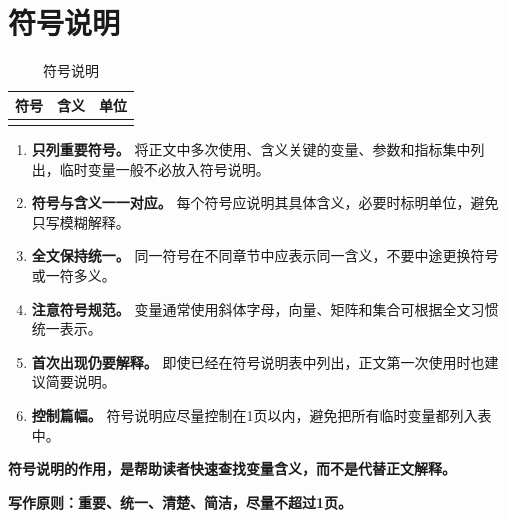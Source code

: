 \section{符号说明}
\begin{table}[!htbp]%
    \caption{符号说明}\label{tab:demo} \centering %
    \renewcommand{\arraystretch}{1.0}%
    \begin{tabularx}{0.7\textwidth}{%
        >{\centering\arraybackslash}X %
        >{\centering\arraybackslash}X
        >{\centering\arraybackslash}X
    }
        \toprule[1.5pt]%
        符号 & 含义 & 单位 \\%
        \midrule[1pt]
        \addlinespace %
        \addlinespace
        \addlinespace
        \addlinespace
        \bottomrule[1.5pt]
    \end{tabularx}
\end{table}
\begin{enumerate}[label=(\arabic*), leftmargin=2.5em, itemsep=0.3em]
\item \textbf{只列重要符号。} 将正文中多次使用、含义关键的变量、参数和指标集中列出，临时变量一般不必放入符号说明。

\item \textbf{符号与含义一一对应。} 每个符号应说明其具体含义，必要时标明单位，避免只写模糊解释。

\item \textbf{全文保持统一。} 同一符号在不同章节中应表示同一含义，不要中途更换符号或一符多义。

\item \textbf{注意符号规范。} 变量通常使用斜体字母，向量、矩阵和集合可根据全文习惯统一表示。

\item \textbf{首次出现仍要解释。} 即使已经在符号说明表中列出，正文第一次使用时也建议简要说明。

\item \textbf{控制篇幅。} 符号说明应尽量控制在1页以内，避免把所有临时变量都列入表中。
\end{enumerate}
\textbf{符号说明的作用，是帮助读者快速查找变量含义，而不是代替正文解释。}

\textbf{写作原则：重要、统一、清楚、简洁，尽量不超过1页。}
